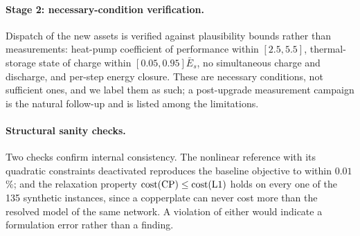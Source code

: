 \paragraph{Stage 2: necessary-condition verification.}
Dispatch of the new assets is verified against plausibility bounds rather than
measurements: heat-pump coefficient of performance within $[2.5, 5.5]$, thermal-storage
state of charge within $[0.05, 0.95]\bar{E}_s$, no simultaneous charge and discharge, and
per-step energy closure. These are necessary conditions, not sufficient ones, and we label
them as such; a post-upgrade measurement campaign is the natural follow-up and is listed
among the limitations.

\paragraph{Structural sanity checks.}
Two checks confirm internal consistency. The nonlinear reference with its quadratic
constraints deactivated reproduces the baseline objective to within $0.01$\,\%; and the
relaxation property $\mathrm{cost}(\mathrm{CP}) \le \mathrm{cost}(\mathrm{L1})$ holds on every one of the
135 synthetic instances, since a copperplate can never cost more than the resolved model of
the same network. A violation of either would indicate a formulation error rather than a
finding.

